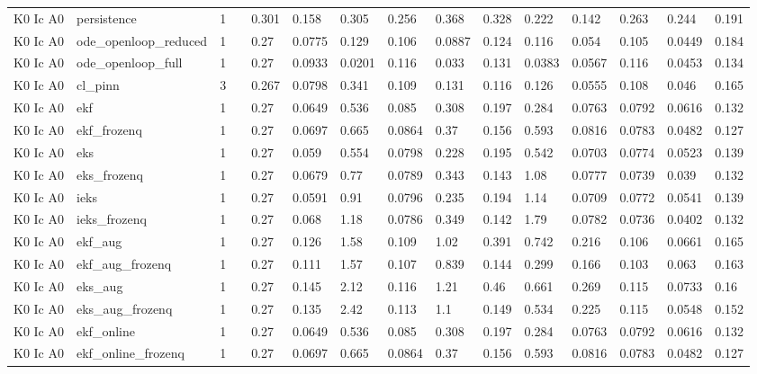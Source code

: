 \begin{table}[t]
\begin{tabular}{lllllllllllllll}
K0 Ic A0 & persistence & 1 &  & 0.301 & 0.158 & 0.305 & 0.256 & 0.368 & 0.328 & 0.222 & 0.142 & 0.263 & 0.244 & 0.191 \\
K0 Ic A0 & ode\_openloop\_reduced & 1 &  & 0.27 & 0.0775 & 0.129 & 0.106 & 0.0887 & 0.124 & 0.116 & 0.054 & 0.105 & 0.0449 & 0.184 \\
K0 Ic A0 & ode\_openloop\_full & 1 &  & 0.27 & 0.0933 & 0.0201 & 0.116 & 0.033 & 0.131 & 0.0383 & 0.0567 & 0.116 & 0.0453 & 0.134 \\
K0 Ic A0 & cl\_pinn & 3 &  & 0.267 & 0.0798 & 0.341 & 0.109 & 0.131 & 0.116 & 0.126 & 0.0555 & 0.108 & 0.046 & 0.165 \\
K0 Ic A0 & ekf & 1 &  & 0.27 & 0.0649 & 0.536 & 0.085 & 0.308 & 0.197 & 0.284 & 0.0763 & 0.0792 & 0.0616 & 0.132 \\
K0 Ic A0 & ekf\_frozenq & 1 &  & 0.27 & 0.0697 & 0.665 & 0.0864 & 0.37 & 0.156 & 0.593 & 0.0816 & 0.0783 & 0.0482 & 0.127 \\
K0 Ic A0 & eks & 1 &  & 0.27 & 0.059 & 0.554 & 0.0798 & 0.228 & 0.195 & 0.542 & 0.0703 & 0.0774 & 0.0523 & 0.139 \\
K0 Ic A0 & eks\_frozenq & 1 &  & 0.27 & 0.0679 & 0.77 & 0.0789 & 0.343 & 0.143 & 1.08 & 0.0777 & 0.0739 & 0.039 & 0.132 \\
K0 Ic A0 & ieks & 1 &  & 0.27 & 0.0591 & 0.91 & 0.0796 & 0.235 & 0.194 & 1.14 & 0.0709 & 0.0772 & 0.0541 & 0.139 \\
K0 Ic A0 & ieks\_frozenq & 1 &  & 0.27 & 0.068 & 1.18 & 0.0786 & 0.349 & 0.142 & 1.79 & 0.0782 & 0.0736 & 0.0402 & 0.132 \\
K0 Ic A0 & ekf\_aug & 1 &  & 0.27 & 0.126 & 1.58 & 0.109 & 1.02 & 0.391 & 0.742 & 0.216 & 0.106 & 0.0661 & 0.165 \\
K0 Ic A0 & ekf\_aug\_frozenq & 1 &  & 0.27 & 0.111 & 1.57 & 0.107 & 0.839 & 0.144 & 0.299 & 0.166 & 0.103 & 0.063 & 0.163 \\
K0 Ic A0 & eks\_aug & 1 &  & 0.27 & 0.145 & 2.12 & 0.116 & 1.21 & 0.46 & 0.661 & 0.269 & 0.115 & 0.0733 & 0.16 \\
K0 Ic A0 & eks\_aug\_frozenq & 1 &  & 0.27 & 0.135 & 2.42 & 0.113 & 1.1 & 0.149 & 0.534 & 0.225 & 0.115 & 0.0548 & 0.152 \\
K0 Ic A0 & ekf\_online & 1 &  & 0.27 & 0.0649 & 0.536 & 0.085 & 0.308 & 0.197 & 0.284 & 0.0763 & 0.0792 & 0.0616 & 0.132 \\
K0 Ic A0 & ekf\_online\_frozenq & 1 &  & 0.27 & 0.0697 & 0.665 & 0.0864 & 0.37 & 0.156 & 0.593 & 0.0816 & 0.0783 & 0.0482 & 0.127 \\

\end{tabular}
\end{table}
